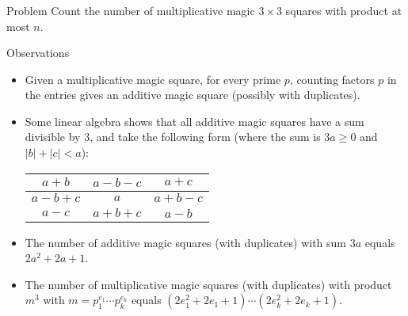 \begin{frame}
    \frametitle{\problemtitle}
    \begin{block}{Problem}
        Count the number of multiplicative magic $3\times 3$ squares with product at most $n$.
    \end{block}
    \pause
    \begin{block}{Observations}
        \begin{itemize}
        \item<+-> Given a multiplicative magic square, for every prime $p$, counting factors $p$ in the entries gives an additive magic square (possibly with duplicates).
        \item<+-> Some linear algebra shows that all additive magic squares have a sum divisible by 3, and take the following form (where the sum is $3a \geq 0$ and $|b| + |c| < a$):
            \begin{table}
            \centering
            \begin{tabular}{|c|c|c|}
                \hline
                $a+b$   & $a-b-c$ & $a+c$   \\\hline
                $a-b+c$ & $a$     & $a+b-c$ \\\hline
                $a-c$   & $a+b+c$ & $a-b$   \\\hline
            \end{tabular}
            \end{table}
        \item<+-> The number of additive magic squares (with duplicates) with sum $3a$ equals $2a^2+2a+1$.
        \item<+-> The number of multiplicative magic squares (with duplicates) with product $m^3$ with $m = p_1^{e_1} \cdots p_k^{e_k}$ equals $(2e_1^2 + 2e_1 + 1) \cdots (2e_k^2 + 2e_k + 1)$.
        \end{itemize}
    \end{block}
\end{frame}

